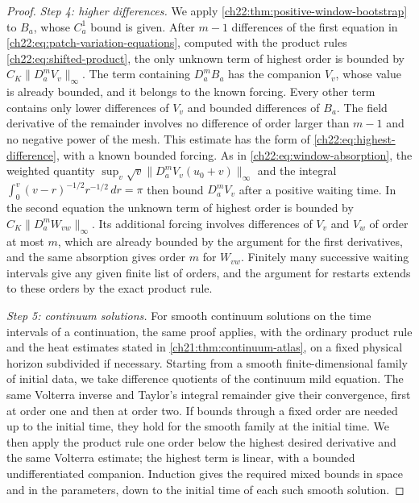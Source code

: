 \begin{proof}
\emph{Step 4: higher differences.} We apply \cref{ch22:thm:positive-window-bootstrap} to $B_a$, whose $C_a^1$ bound is given. After $m-1$ differences of the first equation in \eqref{ch22:eq:patch-variation-equations}, computed with the product rules \eqref{ch22:eq:shifted-product}, the only unknown term of highest order is bounded by $C_K\|D_a^mV_v\|_\infty$. The term containing $D_a^mB_a$ has the companion $V_v$, whose value is already bounded, and it belongs to the known forcing. Every other term contains only lower differences of $V_v$ and bounded differences of $B_a$. The field derivative of the remainder involves no difference of order larger than $m-1$ and no negative power of the mesh. This estimate has the form of \eqref{ch22:eq:highest-difference}, with a known bounded forcing. As in \eqref{ch22:eq:window-absorption}, the weighted quantity $\sup_v\sqrt v\|D^m_aV_v(u_0+v)\|_\infty$ and the integral $\int_0^v(v-r)^{-1/2}r^{-1/2}\,dr=\pi$ then bound $D_a^mV_v$ after a positive waiting time. In the second equation the unknown term of highest order is bounded by $C_K\|D_a^mW_{vw}\|_\infty$. Its additional forcing involves differences of $V_v$ and $V_w$ of order at most $m$, which are already bounded by the argument for the first derivatives, and the same absorption gives order $m$ for $W_{vw}$. Finitely many successive waiting intervals give any given finite list of orders, and the argument for restarts extends to these orders by the exact product rule.

\emph{Step 5: continuum solutions.} For smooth continuum solutions on the time intervals of a continuation, the same proof applies, with the ordinary product rule and the heat estimates stated in \cref{ch21:thm:continuum-atlas}, on a fixed physical horizon subdivided if necessary. Starting from a smooth finite-dimensional family of initial data, we take difference quotients of the continuum mild equation. The same Volterra inverse and Taylor's integral remainder give their convergence, first at order one and then at order two. If bounds through a fixed order are needed up to the initial time, they hold for the smooth family at the initial time. We then apply the product rule one order below the highest desired derivative and the same Volterra estimate; the highest term is linear, with a bounded undifferentiated companion. Induction gives the required mixed bounds in space and in the parameters, down to the initial time of each such smooth solution.
\end{proof}

